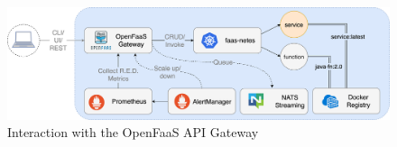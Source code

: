 \begin{figure}[h]
    \centering
    \includegraphics[width=1\textwidth]{./figures/of-workflow.png}
    \caption{Interaction with the OpenFaaS API Gateway~\parencite{openfaas-stack}}
    \label{fig:openfaas-gateway}
\end{figure}